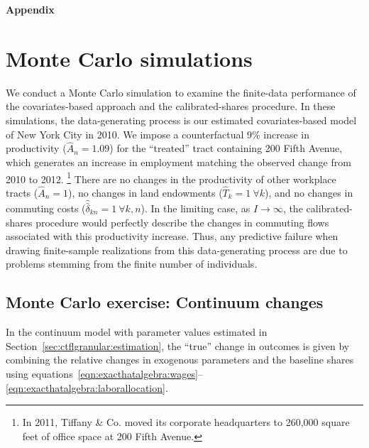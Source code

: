 \documentclass[11pt]{article}
\newcommand{\appendixpagenumbering}{ 
	\pagenumbering{arabic}
	\renewcommand{\thepage}{Appendix - \arabic{page}}
}
\theoremstyle{definition}
\begin{document}
\clearpage

\begin{center} \Large \textbf{Appendix} \end{center}
\appendix
{}
\appendixpagenumbering
\section{Monte Carlo simulations}

We conduct a Monte Carlo simulation to examine the finite-data performance of 
the covariates-based approach and the calibrated-shares procedure.
In these simulations, the data-generating process is our estimated covariates-based model of New York City in 2010.
We impose a counterfactual 9\% increase in productivity ($\hat{A}_{n} = 1.09$) for the ``treated'' tract containing 200 Fifth Avenue,
which generates an increase in employment matching the observed change from 2010 to 2012.%
\footnote{In 2011, Tiffany \& Co. moved its corporate headquarters to 260,000 square feet of office space at 200 Fifth Avenue.}
There are no changes in the productivity of other workplace tracts ($\hat{A}_{n} = 1$),
no changes in land endowments ($\hat{T}_{k} = 1 \ \forall k$),
and no changes in commuting costs ($\hat{\bar{\delta}}_{kn} = 1 \ \forall k,n$).
In the limiting case, as $I\to\infty$, the calibrated-shares procedure would perfectly describe the changes in commuting flows associated with this productivity increase.
Thus, any predictive failure when drawing finite-sample realizations from this data-generating process are due to problems stemming from the finite number of individuals.

\subsection{Monte Carlo exercise: Continuum changes}\label{sec:appendix:counterfactuals:MonteCarlo:continuum}

In the continuum model with parameter values estimated in Section~\ref{sec:ctflgranular:estimation},
the ``true'' change in outcomes is given by combining
the relative changes in exogenous parameters
and
the baseline shares
using equations~\eqref{eqn:exacthatalgebra:wages}--\eqref{eqn:exacthatalgebra:laborallocation}.
\end{document}
